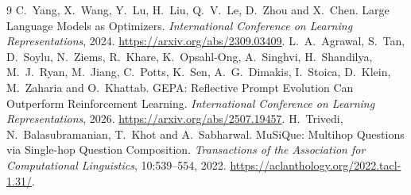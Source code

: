 \documentclass[12pt,a4paper]{report}
\begin{document}
\setcounter{chapter}{4}

\begin{thebibliography}{9}
C.~Yang, X.~Wang, Y.~Lu, H.~Liu, Q.~V.~Le, D.~Zhou and X.~Chen.
Large Language Models as Optimizers.
\emph{International Conference on Learning Representations}, 2024.
\url{https://arxiv.org/abs/2309.03409}.
L.~A.~Agrawal, S.~Tan, D.~Soylu, N.~Ziems, R.~Khare, K.~Opsahl-Ong,
A.~Singhvi, H.~Shandilya, M.~J.~Ryan, M.~Jiang, C.~Potts, K.~Sen,
A.~G.~Dimakis, I.~Stoica, D.~Klein, M.~Zaharia and O.~Khattab.
GEPA: Reflective Prompt Evolution Can Outperform Reinforcement Learning.
\emph{International Conference on Learning Representations}, 2026.
\url{https://arxiv.org/abs/2507.19457}.
H.~Trivedi, N.~Balasubramanian, T.~Khot and A.~Sabharwal.
MuSiQue: Multihop Questions via Single-hop Question Composition.
\emph{Transactions of the Association for Computational Linguistics},
10:539--554, 2022.
\url{https://aclanthology.org/2022.tacl-1.31/}.
\end{thebibliography}
\end{document}
